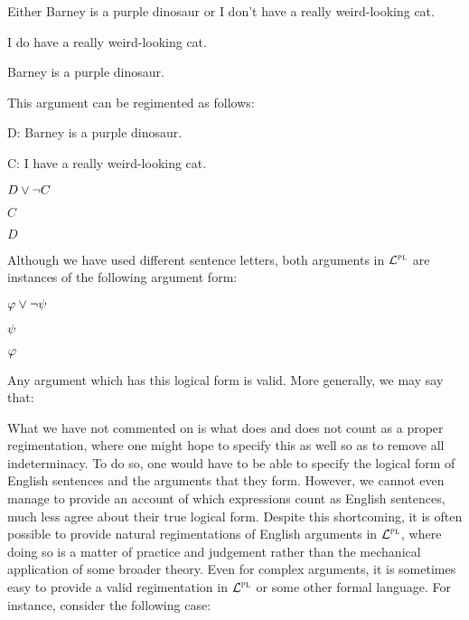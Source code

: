 \begin{earg}
  \item Either Barney is a purple dinosaur or I don't have a really weird-looking cat.
  \item I do have a really weird-looking cat.
  \item[\therefore] Barney is a purple dinosaur.
\end{earg}

This argument can be regimented as follows:

\begin{ekey}
  \item[D:] Barney is a purple dinosaur.
  \item[C:] I have a really weird-looking cat.
\end{ekey}

\begin{earg}
  \item $D\vee\neg C$
  \item $C$
  \item[\therefore] $D$
\end{earg}

Although we have used different sentence letters, both arguments in $\mathcal{L}^{\textsc{pl}}$ are instances of the following argument form:

\begin{earg}
  \item $\varphi\vee\neg \psi$
  \item $\psi$
  \item[\therefore] $\varphi$
\end{earg}

Any argument which has this logical form is valid.
More generally, we may say that:


What we have not commented on is what does and does not count as a proper regimentation, where one might hope to specify this as well so as to remove all indeterminacy.
To do so, one would have to be able to specify the logical form of English sentences and the arguments that they form.
However, we cannot even manage to provide an account of which expressions count as English sentences, much less agree about their true logical form.
Despite this shortcoming, it is often possible to provide natural regimentations of English arguments in $\mathcal{L}^{\textsc{pl}}$, where doing so is a matter of practice and judgement rather than the mechanical application of some broader theory.
Even for complex arguments, it is sometimes easy to provide a valid regimentation in $\mathcal{L}^{\textsc{pl}}$ or some other formal language.
For instance, consider the following case:

